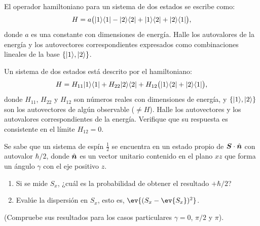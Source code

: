 \begin{enunciado}
El operador hamiltoniano para un sistema de dos estados se escribe como:
\[
H = a \bigl( \lvert1\rangle\langle1\rvert - \lvert2\rangle\langle2\rvert + \lvert1\rangle\langle2\rvert + \lvert2\rangle\langle1\rvert \bigr),
\]
donde $a$ es una constante con dimensiones de energía. Halle los autovalores de la energía y los autovectores correspondientes expresados como combinaciones lineales de la base $\{\lvert1\rangle, \lvert2\rangle\}$.
\end{enunciado}

\begin{enunciado}
Un sistema de dos estados está descrito por el hamiltoniano:
\[
H = H_{11} \lvert1\rangle\langle1\rvert + H_{22} \lvert2\rangle\langle2\rvert + H_{12} \bigl( \lvert1\rangle\langle2\rvert + \lvert2\rangle\langle1\rvert \bigr),
\]
donde $H_{11}$, $H_{22}$ y $H_{12}$ son números reales con dimensiones de energía, y $\{\lvert1\rangle, \lvert2\rangle\}$ son los autovectores de algún observable ($\neq H$). Halle los autovectores y los autovalores correspondientes de la energía. Verifique que su respuesta es consistente en el límite $H_{12} = 0$.
\end{enunciado}

\begin{enunciado}
Se sabe que un sistema de espín $\frac{1}{2}$ se encuentra en un estado propio de $\bm{S} \cdot \hat{\bm{n}}$ con autovalor $\hbar/2$, donde $\hat{\bm{n}}$ es un vector unitario contenido en el plano $xz$ que forma un ángulo $\gamma$ con el eje positivo $z$.
\begin{enumerate}
  \item Si se mide $S_x$, ¿cuál es la probabilidad de obtener el resultado $+\hbar/2$?
  \item Evalúe la dispersión en $S_x$, esto es, $\ev{(S_x - \ev{S_x})^2}$.
\end{enumerate}
(Compruebe sus resultados para los casos particulares $\gamma = 0$, $\pi/2$ y $\pi$).
\end{enunciado}

